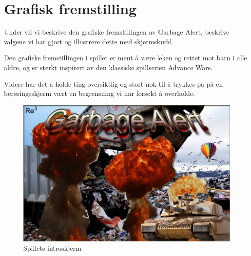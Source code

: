 \section{Grafisk fremstilling}
Under vil vi beskrive den grafiske fremstillingen av Garbage Alert, beskrive valgene vi har gjort og illustrere dette med skjermskudd.

Den grafiske fremstillingen i spillet er ment å være leken og rettet mot barn i alle aldre, og er sterkt inspirert av den klassiske spillserien Advance Wars\cite{advancewars}.

Videre har det å holde ting oversiktlig og stort nok til å trykkes på på en berøringsskjerm vært en begrensning vi har forsøkt å overholde.


\begin{center}
	\begin{figure}
		\includegraphics[width=\textwidth]{images/splashscreen.png}
		\caption{Spillets introskjerm}
		\label{fig:splashscreen}
	\end{figure}
\end{center}

